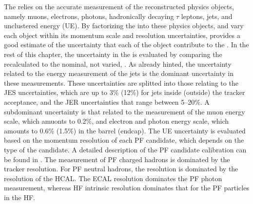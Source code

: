 The \ptmiss relies on the accurate measurement of the reconstructed physics objects, namely muons, electrons, photons, hadronically decaying $\tau$ leptons, jets, and unclustered energy (UE). 
By factorizing the \ptmiss into these physics objects, and vary each object within its momentum scale and resolution uncertainties, provides a good estimate of the uncertainty that each of the object contribute to the \ptmiss. 
\newpara
\noindent\justify
In the rest of this chapter, the uncertainty in the \ptmiss is evaluated by comparing the recalculated \ptmiss to the nominal, not varied, \ptmiss. 
As already hinted, the uncertainty related to the energy measurement of the jets is the dominant uncertainty in these measurements. 
These uncertainties are splitted into those relating to the JES uncertainties, which are up to 3\% (12\%) for jets inside (outside) the tracker acceptance, and the JER uncertainties that range between 5--20\%. 
A subdominant uncertainty is that related to the measurement of the muon energy scale, which amuonts to 0.2\%, and electron and photon energy scale, which amounts to 0.6\% (1.5\%) in the barrel (endcap). 
The UE uncertainty is evaluated based on the momentum resolution of each PF candidate, which depends on the type of the candidate. 
A detailed description of the PF candidate calibration can be found in \cite{Sirunyan:2017ulk,Chatrchyan:2014fea,Khachatryan:2015iwa}.  
The \pt measurement of PF charged hadrons is dominated by the tracker resolution. 
For PF neutral hadrons, the \pt resolution is dominated by the resolution of the HCAL. 
The ECAL resolution dominates the PF photon \pt measurement, whereas HF intrinsic resolution dominates that for the PF particles in the HF. 

